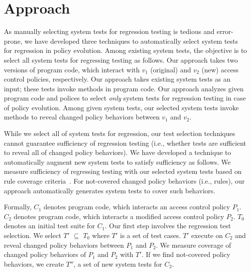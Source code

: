 \section{Approach}
\label{sec:approach}


As manually selecting system tests for regression testing is tedious and error-prone, we have developed three techniques to automatically
select system tests for regression in policy evolution. Among existing system tests, the objective is to select
all system tests for regressing testing as follows.
Our approach takes two versions of program code, which interact with $v_1$ (original) and $v_2$ (new) access control policies, respectively. Our approach takes existing system tests as an input; these tests invoke methods in program code.
Our approach analyzes given program code and polices to select \emph{only} system tests for regression testing in case of policy evolution. Among given system tests, our selected system tests invoke methods to reveal changed policy behaviors between $v_1$ and $v_2$.

While we select all of system tests for regression, our test selection techniques cannot guarantee sufficiency of regression testing (i.e., whether  tests are sufficient to reveal all of changed policy behaviors). We have developed a technique to automatically augment new system
tests to satisfy sufficiency as follows. We measure sufficiency of regressing testing with our selected system tests based on rule coverage criteria~\cite{}. For not-covered changed policy behaviors (i.e., rules), our approach automatically generates system tests to cover such behaviors.

Formally, $C_1$ denotes program code, which interacts an access control policy $P_1$. $C_2$ denotes program code, which interacts a modified access control policy $P_2$. $T_0$ denotes an initial test suite for $C_1$. Our first step involves the regression test selection. We select $T'$ $\subseteq$ $T_0$ where $T'$ is a set of test cases. $T'$ execute on $C_2$ and reveal changed policy behaviors between $P_1$ and $P_2$. We measure coverage of changed policy behaviors of $P_1$ and $P_2$ with $T'$. If we find not-covered policy behaviors, we create $T''$, a set of new system tests for $C_2$. 

